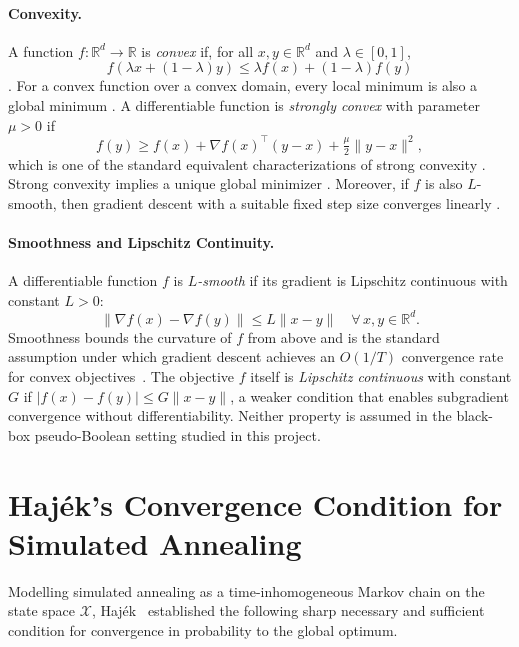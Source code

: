 \paragraph{Convexity.}
A function $f : \mathbb{R}^d \to \mathbb{R}$ is \textit{convex} if, for all
$x,y \in \mathbb{R}^d$ and $\lambda \in [0,1]$,
\[
  f\!\left(\lambda x + (1-\lambda)y\right)
  \leq \lambda f(x) + (1-\lambda)f(y)
\]
\cite[Def.~1.1.1]{bertsekas2009convex}. For a convex function over a convex
domain, every local minimum is also a global minimum
\cite[Prop.~1.3.2]{bertsekas2009convex}. A differentiable function is
\textit{strongly convex} with parameter $\mu>0$ if
\[
  f(y) \geq f(x) + \nabla f(x)^\top (y-x)
  + \tfrac{\mu}{2}\|y-x\|^2,
\]
which is one of the standard equivalent characterizations of strong convexity
\cite[Thm.~2.1.9]{nesterov2018lectures}. Strong convexity implies a unique
global minimizer \cite[Thm.~2.1.8]{nesterov2018lectures}. Moreover, if $f$
is also $L$-smooth, then gradient descent with a suitable fixed step size
converges linearly \cite[Thm.~2.1.15]{nesterov2018lectures}.

\paragraph{Smoothness and Lipschitz Continuity.}
A differentiable function $f$ is \textit{$L$-smooth} if its gradient
is Lipschitz continuous with constant $L > 0$:
\[
  \|\nabla f(x) - \nabla f(y)\| \leq L\|x - y\|
  \quad \forall\, x, y \in \mathbb{R}^d.
\]
Smoothness bounds the curvature of $f$ from above and is the standard
assumption under which gradient descent achieves an $O(1/T)$
convergence rate for convex objectives~\cite{nocedal2006numerical}.
The objective $f$ itself is \textit{Lipschitz continuous} with
constant $G$ if $|f(x) - f(y)| \leq G\|x - y\|$, a weaker condition
that enables subgradient convergence without differentiability.
Neither property is assumed in the black-box pseudo-Boolean setting
studied in this project.

\section{Haj\'{e}k's Convergence Condition for Simulated Annealing}
\label{app:hajek}

Modelling simulated annealing as a time-inhomogeneous Markov chain
on the state space $\mathcal{X}$, Haj\'{e}k~\cite{hajek1988cooling}
established the following sharp necessary and sufficient condition for
convergence in probability to the global optimum.

